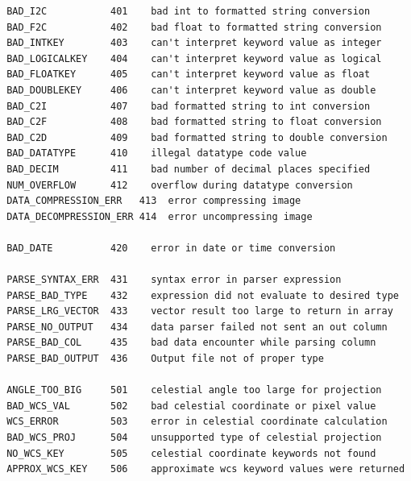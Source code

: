 \documentclass[11pt]{article}
\begin{document}
\begin{verbatim}
 BAD_I2C           401    bad int to formatted string conversion
 BAD_F2C           402    bad float to formatted string conversion
 BAD_INTKEY        403    can't interpret keyword value as integer
 BAD_LOGICALKEY    404    can't interpret keyword value as logical
 BAD_FLOATKEY      405    can't interpret keyword value as float
 BAD_DOUBLEKEY     406    can't interpret keyword value as double
 BAD_C2I           407    bad formatted string to int conversion
 BAD_C2F           408    bad formatted string to float conversion
 BAD_C2D           409    bad formatted string to double conversion
 BAD_DATATYPE      410    illegal datatype code value
 BAD_DECIM         411    bad number of decimal places specified
 NUM_OVERFLOW      412    overflow during datatype conversion
 DATA_COMPRESSION_ERR   413  error compressing image
 DATA_DECOMPRESSION_ERR 414  error uncompressing image

 BAD_DATE          420    error in date or time conversion

 PARSE_SYNTAX_ERR  431    syntax error in parser expression
 PARSE_BAD_TYPE    432    expression did not evaluate to desired type
 PARSE_LRG_VECTOR  433    vector result too large to return in array
 PARSE_NO_OUTPUT   434    data parser failed not sent an out column
 PARSE_BAD_COL     435    bad data encounter while parsing column
 PARSE_BAD_OUTPUT  436    Output file not of proper type

 ANGLE_TOO_BIG     501    celestial angle too large for projection
 BAD_WCS_VAL       502    bad celestial coordinate or pixel value
 WCS_ERROR         503    error in celestial coordinate calculation
 BAD_WCS_PROJ      504    unsupported type of celestial projection
 NO_WCS_KEY        505    celestial coordinate keywords not found
 APPROX_WCS_KEY    506    approximate wcs keyword values were returned
\end{verbatim}
\end{document}
